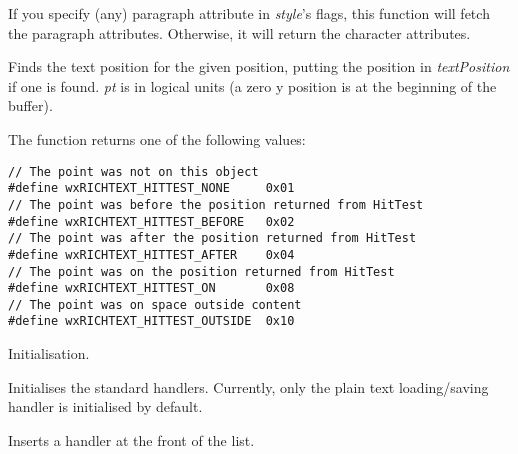 If you specify (any) paragraph attribute in {\it style}'s flags, this function will fetch
the paragraph attributes. Otherwise, it will return the character attributes.

\label{wxrichtextbufferhittest}


Finds the text position for the given position, putting the position in {\it textPosition} if
one is found. {\it pt} is in logical units (a zero y position is
at the beginning of the buffer).

The function returns one of the following values:

{\small
\begin{verbatim}
// The point was not on this object
#define wxRICHTEXT_HITTEST_NONE     0x01
// The point was before the position returned from HitTest
#define wxRICHTEXT_HITTEST_BEFORE   0x02
// The point was after the position returned from HitTest
#define wxRICHTEXT_HITTEST_AFTER    0x04
// The point was on the position returned from HitTest
#define wxRICHTEXT_HITTEST_ON       0x08
// The point was on space outside content
#define wxRICHTEXT_HITTEST_OUTSIDE  0x10
\end{verbatim}
}

\label{wxrichtextbufferinit}


Initialisation.

\label{wxrichtextbufferinitstandardhandlers}


Initialises the standard handlers. Currently, only the plain text loading/saving handler
is initialised by default.

\label{wxrichtextbufferinserthandler}


Inserts a handler at the front of the list.

\label{wxrichtextbufferinsertimagewithundo}


